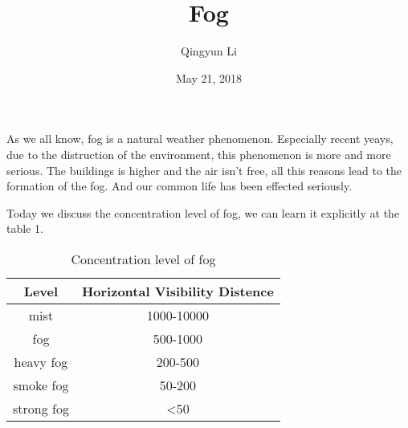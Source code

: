 \documentclass{article}
\author{Qingyun Li}
\date{May 21, 2018}
\title{Fog}
\begin{document}
\maketitle
 \par As we all know, fog is a natural weather phenomenon. Especially recent yeays, due to the distruction of the   environment, this phenomenon is more and more serious. The buildings is higher and the air isn't free, all this reasons lead to the formation of the fog. And our common life has been effected seriously. 
 \par Today we discuss the concentration level of fog, we can learn it explicitly at the table 1.
\begin{table}[htbp]
\centering
\caption{Concentration level of fog}
\begin{tabular}{c|c}
\hline
Level & Horizontal Visibility Distence \\
\hline
mist & 1000-10000 \\
fog & 500-1000 \\
heavy fog & 200-500 \\
smoke fog & 50-200 \\
strong fog & <50 \\
\hline 
\end{tabular} 
\end{table}
\end{document}
